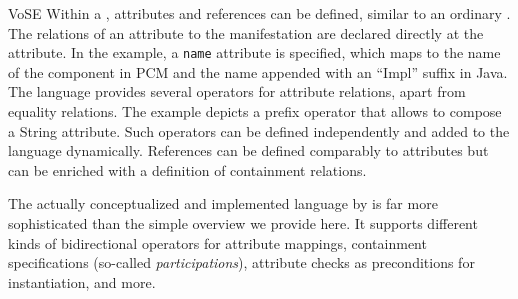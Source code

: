 \begin{copiedFrom}{VoSE}
Within a \commonality, attributes and references can be defined, similar to an ordinary \metaclass.
The relations of an attribute to the manifestation are declared directly at the attribute.
In the example, a \texttt{name} attribute is specified, which maps to the name of the component in \gls{PCM} and the name appended with an \enquote{Impl} suffix in Java.
The language %
provides several operators for attribute relations, apart from equality relations.
The example depicts a prefix operator that allows to compose a String attribute.
Such operators can be defined independently and added to the language dynamically.
References can be defined comparably to attributes but can be enriched with a definition of containment relations.


The actually conceptualized and implemented language by \textcite{gleitze2017a} is far more sophisticated than the simple overview we provide here. 
It supports different kinds of bidirectional operators for attribute mappings, containment specifications (so-called \emph{participations}), attribute checks as preconditions for \commonality instantiation, and more.

\end{copiedFrom} %
